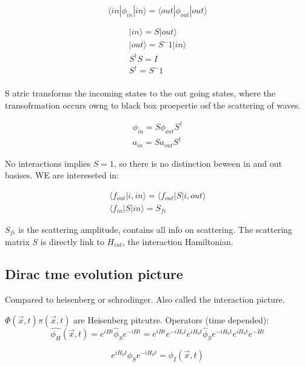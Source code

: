 \documentclass[]{article}
\begin{document}
	\begin{equation}
	{\langle in|\phi_{in}|in\rangle = \langle out|\phi_{out}|out\rangle}
	\end{equation}
	
	\begin{align}
	|in\rangle = S|out\rangle\\
	|out\rangle = S^-1|in\rangle\\
	S^\dagger S = I\\
	S^\dagger = S^-1\\
	\end{align}
	
	S atric transforms the incoming states to the out going states, where the transofrmation occurs owng to black box proepertie osf the scattering of waves.
	
	\begin{align}
		\phi_{in} = S\phi_{out}S^\dagger \\
		a_{in} = Sa_{out}S^\dagger	
	\end{align}
	
	No interactions implies $S = 1$, so there is no distinction beween in and out basises. WE are intereseted in:
	
	\begin{align}
		\langle f_{out}|i, in\rangle = \langle f_{out}|S|i, out\rangle \\
		\langle f_{in}|S|in\rangle = S_{fi}
	\end{align}
	
	$S_{fi}$ is the scattering amplitude, contains all info on scattering. The scattering matrix $S$ is directly link to $H_{int}$, the interaction Hamiltonian.
	
	\subsection{Dirac tme evolution picture}
	
	Compared to heisenberg or schrodinger. Also called the interaction picture.
	
	$\Phi(\overrightarrow{x}, t) \pi(\overrightarrow{x}, t)$ are Heisenberg pitcutre.
	Operators (time depended):
	\begin{equation}
	\hat{\phi_H}(\vec{x}, t) = e^{iHt}\hat{\phi}_Se^{-iHt} = e^{iHt}e^{-iH_0t}e^{iH_0t}\hat{\phi}_Se^{-iH_0t}e^{iH_0t}e^{-Ht}
	\end{equation}
	
	\begin{equation}
	e^{iH_0t}\phi_Se^{-iH_0t} = \phi_I(\vec{x}, t)
	\end{equation}
	
\end{document}
